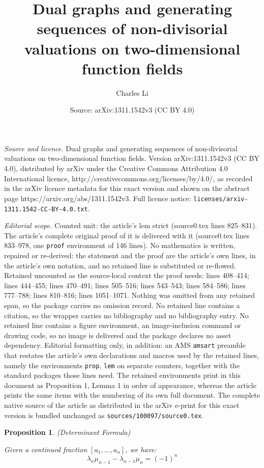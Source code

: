 \documentclass[10pt,a4paper]{amsart}
\title{Dual graphs and generating sequences of non-divisorial valuations on two-dimensional function fields}
\author{Charles Li}
\date{Source: arXiv:1311.1542v3 (CC BY 4.0)}
\newtheorem{prop}{Proposition}
\begin{document}
\maketitle

\noindent\emph{Source and licence.} Dual graphs and generating sequences of non-divisorial valuations on two-dimensional function fields. Version arXiv:1311.1542v3 (CC BY 4.0), distributed by arXiv under the Creative Commons Attribution 4.0 International licence, http://creativecommons.org/licenses/by/4.0/, as recorded in the arXiv licence metadata for this exact version and shown on the abstract page https://arxiv.org/abs/1311.1542v3. Full licence notice: \texttt{licenses/arxiv-1311.1542-CC-BY-4.0.txt}.\par\smallskip

\noindent\textit{Editorial scope.} Counted unit: the article's lem strict (source0.tex lines 825--831). The article's complete original proof of it is delivered with it (source0.tex lines 833--978, one \texttt{proof} environment of 146 lines). No mathematics is written, repaired or re-derived: the statement and the proof are the article's own lines, in the article's own notation, and no retained line is substituted or re-flowed.  Retained uncounted as the source-local context the proof needs: lines 408--414; lines 444--455; lines 470--491; lines 505--516; lines 543--543; lines 584--586; lines 777--788; lines 810--816; lines 1051--1071.  Nothing was omitted from any retained span, so the package carries no omission record.  No retained line contains a citation, so the wrapper carries no bibliography and no bibliography entry.  No retained line contains a figure environment, an image-inclusion command or drawing code, so no image is delivered and the package declares no asset dependency.  Editorial formatting only, in addition: an AMS \texttt{amsart} preamble that restates the article's own declarations and macros used by the retained lines, namely the environments \texttt{prop}, \texttt{lem} on separate counters, together with the standard packages those lines need.  The retained environments print in this document as Proposition 1, Lemma 1 in order of appearance, whereas the article prints the same items with the numbering of its own full document.  The complete native source of the article as distributed in the arXiv e-print for this exact version is bundled unchanged as \texttt{sources/100097/source0.tex}.
\begin{prop} \label{condet} (Determinant Formula)

Given a continued fraction $\displaystyle [a_1, \ldots, a_n]$, we have:
\begin{equation*}
\lambda_n\mu_{n-1}-\lambda_{n-1}\mu_n = (-1)^{n}
\end{equation*}
\end{prop}
\end{document}
